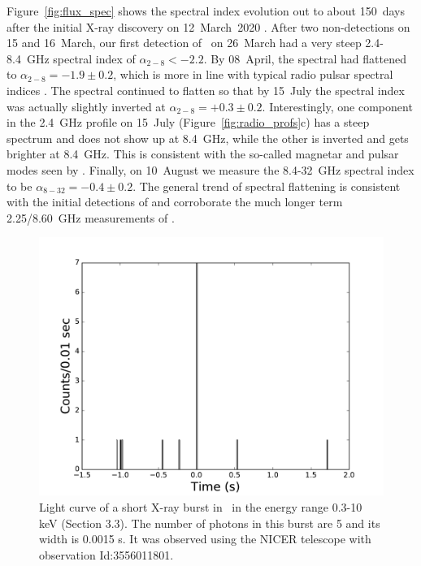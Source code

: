 \documentclass[twocolumn]{emulateapj}
\begin{document}
Figure~\ref{fig:flux_spec} shows the spectral index evolution 
out to about 150~days after the initial X-ray discovery 
on 12~March~2020 \citep{esposito20}.  After two non-detections 
on 15 and 16~March, our first detection of \jmag\ on 
26~March had a very steep 2.4-8.4~GHz spectral index of 
$\alpha_{2-8} < -2.2$.  By 08~April, the spectral had flattened 
to $\alpha_{2-8} = -1.9 \pm 0.2$, which is more in line with 
typical radio pulsar spectral indices \citep[e.g.,][]{maron2000}. 
The spectral continued to flatten so that by 15~July the spectral 
index was actually slightly inverted at $\alpha_{2-8} = +0.3 \pm 0.2$. 
Interestingly, one component in the 2.4~GHz profile on 15~July 
(Figure~\ref{fig:radio_profs}c) has a steep spectrum and does 
not show up at 8.4~GHz, while the other is inverted and gets 
brighter at 8.4~GHz.  This is consistent with the so-called 
magnetar and pulsar modes seen by \citet{lower2021}.  Finally, 
on 10~August we measure the 8.4-32~GHz spectral index to be 
$\alpha_{8-32} = -0.4\pm 0.2$.  The general trend of spectral 
flattening is consistent with the initial detections of 
\citet{champion2020} and corroborate the much longer term 
2.25/8.60~GHz measurements of \citet{huang2021}. 






\begin{figure}[b]
	\centering
	\includegraphics[trim=0cm 0cm 0cm 0cm, clip=false, scale=0.55, angle=0]{plots/J1818_burst_light_curve.pdf}
	\caption{Light curve of a short X-ray burst in \jmag\, in the energy 
             range 0.3-10 keV (Section 3.3). The number of photons in this burst 
             are 5 and its width is 0.0015 s. It was observed using the NICER 
             telescope with observation Id:3556011801.} 
	\label{fig:xray_burst}
\end{figure}
\end{document}
